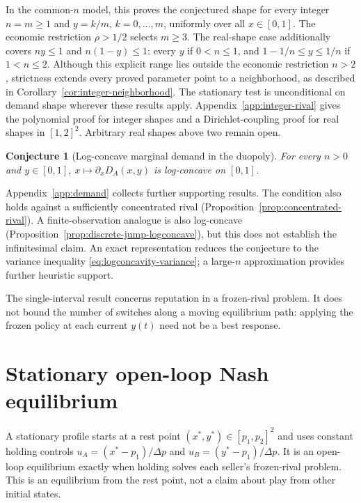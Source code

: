 \documentclass[11pt]{article}
\newtheorem{conjecture}{Conjecture}
\theoremstyle{definition}
\begin{document}
In the common-$n$ model, this proves the conjectured shape for every
integer $n=m\geq1$ and $y=k/m$, $k=0,\ldots,m$, uniformly over all
$x\in[0,1]$. The economic restriction $\rho>1/2$ selects $m\geq3$.
The real-shape case additionally covers $ny\leq1$ and $n(1-y)\leq1$:
every $y$ if $0<n\leq1$, and $1-1/n\leq y\leq1/n$ if $1<n\leq2$.
Although this explicit range lies outside the economic restriction $n>2$,
strictness extends every proved parameter point to a neighborhood, as
described in Corollary~\ref{cor:integer-neighborhood}. The stationary test
is unconditional on demand shape wherever these results apply.
Appendix~\ref{app:integer-rival} gives the polynomial proof for integer
shapes and a Dirichlet-coupling proof for real shapes in $[1,2]^2$.
Arbitrary real shapes above two remain open.

\begin{conjecture}[Log-concave marginal demand in the duopoly]
\label{conj:duopoly-logconcave}
For every $n>0$ and $y\in[0,1]$, $x\mapsto\partial_xD_A(x,y)$ is
log-concave on $[0,1]$.
\end{conjecture}

Appendix~\ref{app:demand} collects further supporting results. The condition
also holds against a sufficiently concentrated rival
(Proposition~\ref{prop:concentrated-rival}). A finite-observation analogue
is also log-concave (Proposition~\ref{prop:discrete-jump-logconcave}), but
this does not establish the infinitesimal claim. An exact representation
reduces the conjecture to the variance inequality
\eqref{eq:logconcavity-variance}; a large-$n$ approximation provides further
heuristic support.

The single-interval result concerns reputation in a frozen-rival problem.
It does not bound the number of switches along a moving equilibrium path:
applying the frozen policy at each current $y(t)$ need not be a best response.

\section{Stationary open-loop Nash equilibrium}\label{sec:fluid-steady}

A stationary profile starts at a rest point $(x^*,y^*)\in[p_1,p_2]^2$
and uses constant holding controls
$u_A=(x^*-p_1)/\Delta p$ and $u_B=(y^*-p_1)/\Delta p$.
It is an open-loop equilibrium exactly when holding solves each seller's
frozen-rival problem. This is an equilibrium from the rest point, not a
claim about play from other initial states.
\end{document}
